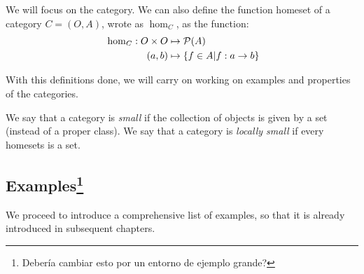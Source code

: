 We will focus on the category. We can also define the function homeset of a category $C=(O,A)$, wrote as $\hom_{C}$, as the function:
\begin{align*}
  && \hom_{C}: O \times O &\mapsto \mathcal{P}(A)&\\
  \displaystyle &\ &(a,b)&\mapsto \{f\in A | f:a\to b\}&
\end{align*}

With this definitions done, we will carry on working on examples and properties of the categories.

\begin{definition}
  We say that a category is \emph{small} if the collection of objects is given by a set (instead of a proper class). We say that a category is \emph{locally small} if every homesets is a set.
\end{definition}

\subsection{Examples\footnote{Debería cambiar esto por un entorno de ejemplo grande?}}
We proceed to introduce a comprehensive list of examples, so that it is already introduced in subsequent chapters.

